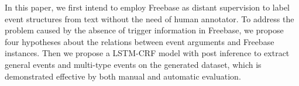 In this paper, we first intend to employ Freebase as distant supervision to label event structures from text without the need of human annotator. To address the problem caused by the absence of trigger information in Freebase, we propose four hypotheses about the relations between event arguments and Freebase instances. Then we propose a LSTM-CRF model with post inference to extract general events and multi-type events on the generated dataset, which is demonstrated effective by both manual and automatic evaluation.
